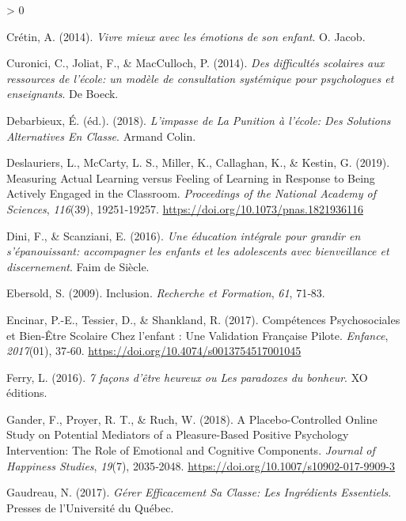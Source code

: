 \documentclass[
  french,
]{article}
\newlength{\cslhangindent}
\newenvironment{CSLReferences}[2] %
 {%
  \setlength{\parindent}{0pt}
  \ifodd #1 \everypar{\setlength{\hangindent}{\cslhangindent}}\ignorespaces\fi
  \ifnum #2 > 0
  \setlength{\parskip}{#2\baselineskip}
  \fi
 }%
 {}
\begin{document}
\begin{CSLReferences}{1}{0}
\leavevmode\hypertarget{ref-cretin2014}{}%
Crétin, A. (2014). \emph{{Vivre mieux avec les émotions de son enfant}}. {O. Jacob}.

\leavevmode\hypertarget{ref-curonici2014}{}%
Curonici, C., Joliat, F., \& MacCulloch, P. (2014). \emph{{Des difficultés scolaires aux ressources de l'école: un modèle de consultation systémique pour psychologues et enseignants}}. {De Boeck}.

\leavevmode\hypertarget{ref-debarbieux2018}{}%
Debarbieux, É. (éd.). (2018). \emph{L'impasse de La Punition à l'école: Des Solutions Alternatives En Classe}. {Armand Colin}.

\leavevmode\hypertarget{ref-deslauriers2019}{}%
Deslauriers, L., McCarty, L. S., Miller, K., Callaghan, K., \& Kestin, G. (2019). Measuring Actual Learning versus Feeling of Learning in Response to Being Actively Engaged in the Classroom. \emph{Proceedings of the National Academy of Sciences}, \emph{116}(39), 19251‑19257. \url{https://doi.org/10.1073/pnas.1821936116}

\leavevmode\hypertarget{ref-dini2016}{}%
Dini, F., \& Scanziani, E. (2016). \emph{{Une éducation intégrale pour grandir en s'épanouissant: accompagner les enfants et les adolescents avec bienveillance et discernement}}. {Faim de Siècle}.

\leavevmode\hypertarget{ref-ebersold2009}{}%
Ebersold, S. (2009).{} {Inclusion}{}. \emph{Recherche et Formation}, \emph{61}, 71‑83.

\leavevmode\hypertarget{ref-encinar2017}{}%
Encinar, P.-E., Tessier, D., \& Shankland, R. (2017). Compétences Psychosociales et Bien-Être Scolaire Chez l'enfant : Une Validation Française Pilote. \emph{Enfance}, \emph{2017}(01), 37‑60. \url{https://doi.org/10.4074/s0013754517001045}

\leavevmode\hypertarget{ref-ferry2016a}{}%
Ferry, L. (2016). \emph{{7 façons d'être heureux ou Les paradoxes du bonheur}}. {XO éditions}.

\leavevmode\hypertarget{ref-gander2018}{}%
Gander, F., Proyer, R. T., \& Ruch, W. (2018). A {Placebo}-{Controlled Online Study} on {Potential Mediators} of a {Pleasure}-{Based Positive Psychology Intervention}: {The Role} of {Emotional} and {Cognitive Components}. \emph{Journal of Happiness Studies}, \emph{19}(7), 2035‑2048. \url{https://doi.org/10.1007/s10902-017-9909-3}

\leavevmode\hypertarget{ref-gaudreau2017}{}%
Gaudreau, N. (2017). \emph{Gérer Efficacement Sa Classe: Les Ingrédients Essentiels}. {Presses de l'Université du Québec}.


\end{CSLReferences}
\end{document}
